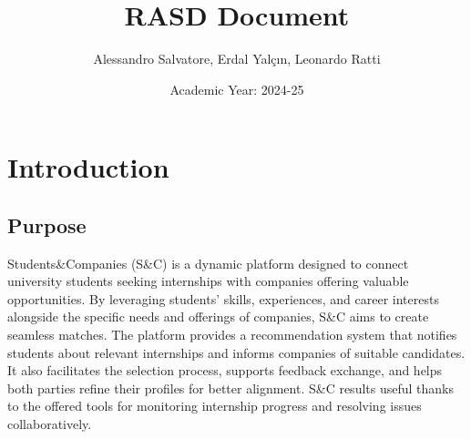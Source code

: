 \documentclass[a4paper,12pt]{article}
\begin{document}
\title{RASD Document}
\author{Alessandro Salvatore, Erdal Yalçın, Leonardo Ratti}
\date{Academic Year: 2024-25}
\maketitle

\newpage
\tableofcontents

\newpage
\section{Introduction}
\subsection{Purpose}
Students\&Companies (S\&C) is a dynamic platform designed to connect university students seeking internships with companies offering valuable opportunities. By leveraging students' skills, experiences, and career interests alongside the specific needs and offerings of companies, S\&C aims to create seamless matches. The platform provides a recommendation system that notifies students about relevant internships and informs companies of suitable candidates. It also facilitates the selection process, supports feedback exchange, and helps both parties refine their profiles for better alignment. S\&C results useful thanks to the offered tools for monitoring internship progress and resolving issues collaboratively.
\end{document}

